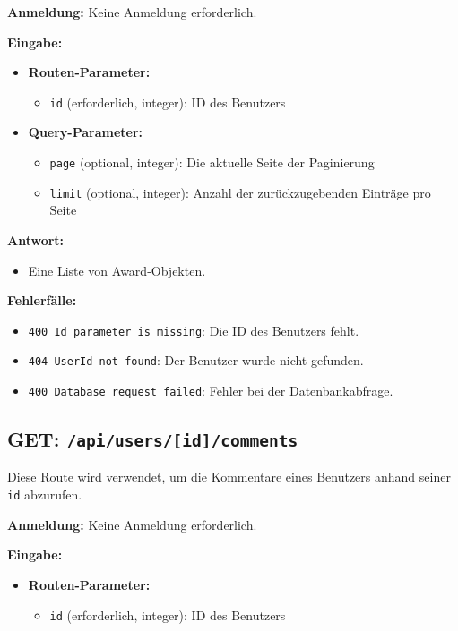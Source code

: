 \documentclass[a4paper,12pt]{article}
\begin{document}
\textbf{Anmeldung:} Keine Anmeldung erforderlich.

\textbf{Eingabe:}
\begin{itemize}
    \item \textbf{Routen-Parameter:}
    \begin{itemize}
        \item \texttt{id} (erforderlich, integer):
            ID des Benutzers
    \end{itemize}
    \item \textbf{Query-Parameter:}
    \begin{itemize}
        \item \texttt{page} (optional, integer):
            Die aktuelle Seite der Paginierung
        \item \texttt{limit} (optional, integer):
            Anzahl der zurückzugebenden Einträge pro Seite
    \end{itemize}
\end{itemize}

\textbf{Antwort:}
\begin{itemize}
    \item Eine Liste von Award-Objekten.
\end{itemize}

\textbf{Fehlerfälle:}
\begin{itemize}
    \item \texttt{400 Id parameter is missing}:
        Die ID des Benutzers fehlt.
    \item \texttt{404 UserId not found}:
        Der Benutzer wurde nicht gefunden.
    \item \texttt{400 Database request failed}:
        Fehler bei der Datenbankabfrage.
\end{itemize}

\newpage
\subsection{GET: \texttt{/api/users/[id]/comments}}

Diese Route wird verwendet, um die Kommentare eines Benutzers anhand seiner
\texttt{id} abzurufen.

\textbf{Anmeldung:} Keine Anmeldung erforderlich.

\textbf{Eingabe:}
\begin{itemize}
    \item \textbf{Routen-Parameter:}
    \begin{itemize}
        \item \texttt{id} (erforderlich, integer):
            ID des Benutzers
    \end{itemize}
\end{itemize}
\end{document}
